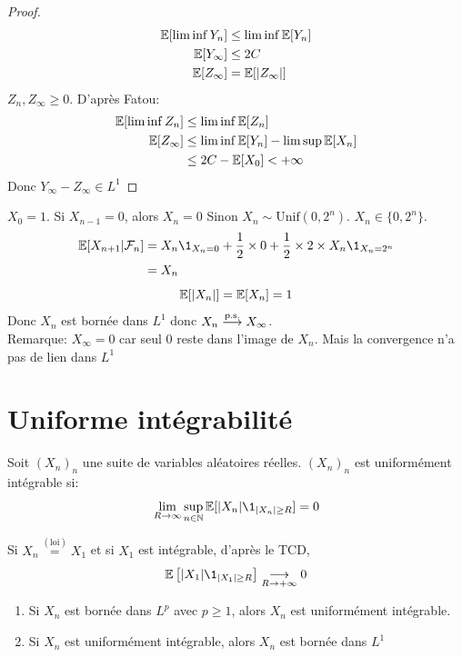 \documentclass[]{report}
\begin{document}
\begin{proof}
\begin{align*}
            \mathbb{E}[\liminf Y_n]&\le \liminf \mathbb{E}[Y_n]\\
            \mathbb{E}[Y_\infty]&\le 2C\\
            \mathbb{E}[Z_\infty]&=\mathbb{E}[|Z_\infty|]
        \end{align*}
        $Z_n,Z_\infty\ge 0$. D'après Fatou:
        \begin{align*}
            \mathbb{E}[\liminf Z_n]&\le \liminf \mathbb{E}[Z_n]\\
            \mathbb{E}[Z_\infty]&\le \liminf \mathbb{E}[Y_n]-\limsup \mathbb{E}[X_n]\\
            &\le 2C - \mathbb{E}[X_0]<+\infty
        \end{align*}
        Donc $Y_\infty-Z_\infty\in L^1$
    \end{proof}

    \begin{ex}{}{}
        $X_0=1$. Si $X_{n-1}=0$, alors $X_n=0$ Sinon $X_n\sim \text{Unif}({0,2^n})$. $X_n \in \{0,2^n\}$.
        \begin{align*}
            \Ea[X_{n+1}|\Fr_n]&=X_n\1_{X_n=0}+\frac{1}{2}\times 0 +\frac{1}{2} \times 2\times X_n \1_{X_n=2^{n}}\\
            &=X_n
        \end{align*}
        \[\mathbb{E}[|X_n|]=\mathbb{E}[X_n]=1\]
        Donc $X_n$ est bornée dans $L^1$ donc $X_n\overset{\text{p.s.}}{\longrightarrow} X_{\infty}$.\\
        Remarque: $X_\infty=0$ car seul $0$ reste dans l'image de $X_n$. Mais la convergence n'a pas de lien dans $L^1$
    \end{ex}

    \section{Uniforme intégrabilité}

    \begin{df}{}{}
        Soit $(X_n)_n$ une suite de variables aléatoires réelles. $(X_n)_n$ est uniformément intégrable si:
        \[\lim_{R\to \infty}\sup_{n\in \N} \Ea[|X_n|\1_{|X_n|\ge R}]=0\]
    \end{df}

    \begin{re}{}{}
        Si $\displaystyle{X_n\overset{(\text{loi})}{=}X_1}$ et si $X_1$ est intégrable, d'après le TCD,
        \[\Ea\left[|X_1|\1_{|X_1|\ge R}\right]\underset{R\to +\infty}{\longrightarrow} 0\]
    \end{re}

    \begin{prop}{}{}
        \begin{enumerate}
            \item Si $X_n$ est bornée dans $L^p$ avec $p\ge 1$, alors $X_n$ est uniformément intégrable.
            \item Si $X_n$ est uniformément intégrable, alors $X_n$ est bornée dans $L^1$
        \end{enumerate}
    \end{prop}
\end{document}
